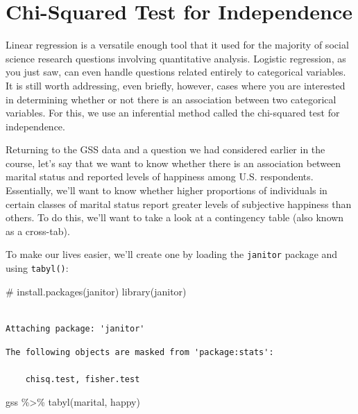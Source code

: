 \documentclass[
  letterpaper,
]{book}
\newenvironment{Shaded}{\begin{snugshade}}{\end{snugshade}}
\newcommand{\CommentTok}[1]{\textcolor[rgb]{0.37,0.37,0.37}{#1}}
\newcommand{\FunctionTok}[1]{\textcolor[rgb]{0.28,0.35,0.67}{#1}}
\newcommand{\NormalTok}[1]{\textcolor[rgb]{0.00,0.23,0.31}{#1}}
\newcommand{\SpecialCharTok}[1]{\textcolor[rgb]{0.37,0.37,0.37}{#1}}
\begin{document}
\hypertarget{chi-squared-test-for-independence}{%
\section{Chi-Squared Test for
Independence}\label{chi-squared-test-for-independence}}

Linear regression is a versatile enough tool that it used for the
majority of social science research questions involving quantitative
analysis. Logistic regression, as you just saw, can even handle
questions related entirely to categorical variables. It is still worth
addressing, even briefly, however, cases where you are interested in
determining whether or not there is an association between two
categorical variables. For this, we use an inferential method called the
chi-squared test for independence.

Returning to the GSS data and a question we had considered earlier in
the course, let's say that we want to know whether there is an
association between marital status and reported levels of happiness
among U.S. respondents. Essentially, we'll want to know whether higher
proportions of individuals in certain classes of marital status report
greater levels of subjective happiness than others. To do this, we'll
want to take a look at a contingency table (also known as a cross-tab).

To make our lives easier, we'll create one by loading the
\texttt{janitor} package and using \texttt{tabyl()}:

\begin{Shaded}
\begin{Highlighting}[]
\CommentTok{\# install.packages(\textquotesingle{}janitor\textquotesingle{})}
\FunctionTok{library}\NormalTok{(janitor)}
\end{Highlighting}
\end{Shaded}

\begin{verbatim}

Attaching package: 'janitor'
\end{verbatim}

\begin{verbatim}
The following objects are masked from 'package:stats':

    chisq.test, fisher.test
\end{verbatim}

\begin{Shaded}
\begin{Highlighting}[]
\NormalTok{gss }\SpecialCharTok{\%\textgreater{}\%}
  \FunctionTok{tabyl}\NormalTok{(marital, happy)}
\end{Highlighting}
\end{Shaded}
\end{document}
